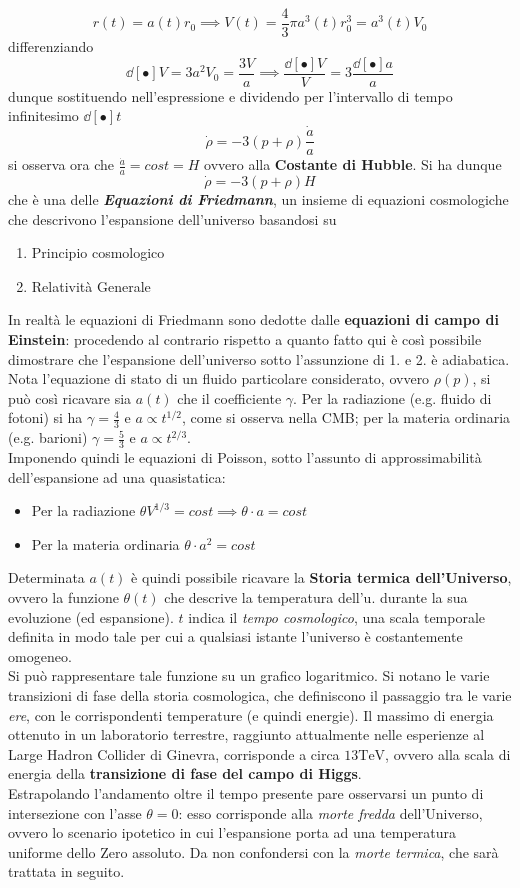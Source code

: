 \documentclass[10pt, oneside]{book}
\newcommand{\ds}{\displaystyle}
\begin{document}
\[r(t) = a(t) r_0 \implies V(t) = \frac{4}{3} \pi a^3(t) r_0^3 = a^3(t) V_0\]
differenziando
\[\dd[•]{V} = 3 a^2 V_0 = \frac{3 V}{a} \implies \frac{\dd[•]{V}}{V} = 3 \frac{\dd[•]{a}}{a}\]
dunque sostituendo nell'espressione e dividendo per l'intervallo di tempo infinitesimo $\dd[•]{t}$
\[\dot \rho = - 3 (p + \rho) \frac{\dot a}{a}\]
si osserva ora che $\ds \frac{\dot a}{a} = cost = H$ ovvero alla \textbf{Costante di Hubble}. Si ha dunque
\[\dot \rho = - 3 (p + \rho) H\]
che è una delle \textbf{\textit{Equazioni di Friedmann}}, un insieme di equazioni cosmologiche che descrivono l'espansione dell'universo basandosi su
\begin{enumerate}
\item Principio cosmologico
\item Relatività Generale
\end{enumerate}
In realtà le equazioni di Friedmann sono dedotte dalle \textbf{equazioni di campo di Einstein}: procedendo al contrario rispetto a quanto fatto qui è così possibile dimostrare che l'espansione dell'universo sotto l'assunzione di 1. e 2. è adiabatica.\\
Nota l'equazione di stato di un fluido particolare considerato, ovvero $\rho(p)$, si può così ricavare sia $a(t)$ che il coefficiente $\gamma$. Per la radiazione (e.g. fluido di fotoni) si ha $\ds \gamma = \frac{4}{3}$ e $\ds a \propto t^{1/2}$, come si osserva nella CMB; per la materia ordinaria (e.g. barioni) $\ds \gamma = \frac{5}{3}$ e $\ds a \propto t^{2/3}$.\\
Imponendo quindi le equazioni di Poisson, sotto l'assunto di approssimabilità dell'espansione ad una quasistatica:
\begin{itemize}
\item Per la radiazione $\ds \theta V^{1/3} = cost 	\implies \theta \cdot a = cost$
\item Per la materia ordinaria $\ds \theta \cdot a^2 = cost$
\end{itemize}
Determinata $a(t)$ è quindi possibile ricavare la \textbf{Storia termica dell'Universo}, ovvero la funzione $\theta(t)$ che descrive la temperatura dell'u. durante la sua evoluzione (ed espansione). $t$ indica il \textit{tempo cosmologico}, una scala temporale definita in modo tale per cui a qualsiasi istante l'universo è costantemente omogeneo.\\
Si può rappresentare tale funzione su un grafico logaritmico. Si notano le varie transizioni di fase della storia cosmologica, che definiscono il passaggio tra le varie \textit{ere}, con le corrispondenti temperature (e quindi energie). Il massimo di energia ottenuto in un laboratorio terrestre, raggiunto attualmente nelle esperienze al Large Hadron Collider di Ginevra, corrisponde a circa $13 \mathrm{TeV}$, ovvero alla scala di energia della \textbf{transizione di fase del campo di Higgs}.\\
Estrapolando l'andamento oltre il tempo presente pare osservarsi un punto di intersezione con l'asse $\theta = 0$: esso corrisponde alla \textit{morte fredda} dell'Universo, ovvero lo scenario ipotetico in cui l'espansione porta ad una temperatura uniforme dello Zero assoluto. Da non confondersi con la \textit{morte termica}, che sarà trattata in seguito.
\end{document}
